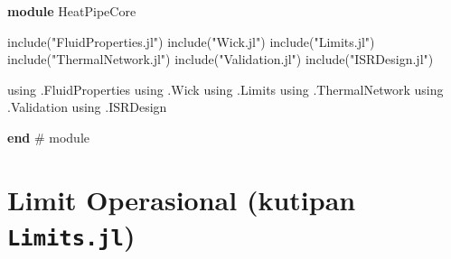 \documentclass[
  indonesian,
  12pt,
  a4paper,
]{report}
\newenvironment{Shaded}{\begin{snugshade}}{\end{snugshade}}
\newcommand{\BuiltInTok}[1]{\textcolor[rgb]{0.00,0.23,0.31}{#1}}
\newcommand{\CommentTok}[1]{\textcolor[rgb]{0.37,0.37,0.37}{#1}}
\newcommand{\FunctionTok}[1]{\textcolor[rgb]{0.28,0.35,0.67}{#1}}
\newcommand{\ImportTok}[1]{\textcolor[rgb]{0.00,0.46,0.62}{#1}}
\newcommand{\KeywordTok}[1]{\textcolor[rgb]{0.00,0.23,0.31}{\textbf{#1}}}
\newcommand{\NormalTok}[1]{\textcolor[rgb]{0.00,0.23,0.31}{#1}}
\newcommand{\StringTok}[1]{\textcolor[rgb]{0.13,0.47,0.30}{#1}}
\begin{document}
\begin{Shaded}
\begin{Highlighting}[]
\KeywordTok{module}\NormalTok{ HeatPipeCore}

\FunctionTok{include}\NormalTok{(}\StringTok{"FluidProperties.jl"}\NormalTok{)}
\FunctionTok{include}\NormalTok{(}\StringTok{"Wick.jl"}\NormalTok{)}
\FunctionTok{include}\NormalTok{(}\StringTok{"Limits.jl"}\NormalTok{)}
\FunctionTok{include}\NormalTok{(}\StringTok{"ThermalNetwork.jl"}\NormalTok{)}
\FunctionTok{include}\NormalTok{(}\StringTok{"Validation.jl"}\NormalTok{)}
\FunctionTok{include}\NormalTok{(}\StringTok{"ISRDesign.jl"}\NormalTok{)}

\ImportTok{using} \BuiltInTok{.FluidProperties}
\ImportTok{using} \BuiltInTok{.Wick}
\ImportTok{using} \BuiltInTok{.Limits}
\ImportTok{using} \BuiltInTok{.ThermalNetwork}
\ImportTok{using} \BuiltInTok{.Validation}
\ImportTok{using} \BuiltInTok{.ISRDesign}

\KeywordTok{end} \CommentTok{\# module}
\end{Highlighting}
\end{Shaded}

\section{\texorpdfstring{Limit Operasional (kutipan
\texttt{Limits.jl})}{Limit Operasional (kutipan Limits.jl)}}\label{limit-operasional-kutipan-limits.jl}
\end{document}
